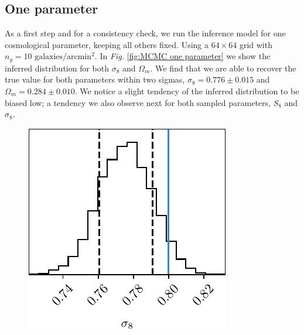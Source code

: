 \subsection{One parameter}
As a first step and for a consistency check, we run the inference model for one cosmological parameter, keeping all others fixed. Using a $64\times64$ grid with $n_g=10 \text{ galaxies}/\text{arcmin}^2$. In \textit{Fig. }\ref{fig:MCMC one parameter} we show the inferred distribution for both $\sigma_8$ and $\Omega_m$. We find that we are able to recover the true value for both parameters within two sigmas, $\sigma_8 = 0.776\pm0.015$ and $\Omega_m = 0.284\pm0.010$. We notice a slight tendency of the inferred distribution to be biased low; a tendency we also observe next for both sampled parameters, $S_8$ and $\sigma_8$.
\begin{figure}[h]
    \begin{minipage}[b]{0.48\textwidth}
        \centering
        \includegraphics[width=\textwidth]{images/6_MCMC_sigma_parameters.pdf}
    \end{minipage}
    \hfill %
    \begin{minipage}[b]{0.48\textwidth}
        \centering

\end{minipage}
\end{figure}

